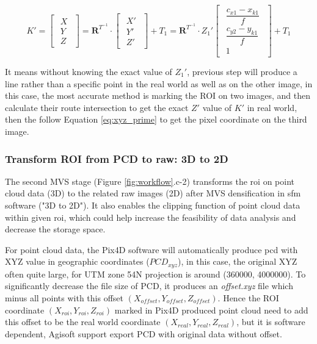 \documentclass{configs/bmcart}
\begin{document}
$$
  K' = 
  \begin{bmatrix}
    \begin{matrix}
      X \\ Y \\ Z
    \end{matrix}
  \end{bmatrix} 
  = 
  \mathbf{R}^{T^{-1}} \cdot 
  \begin{bmatrix}
    \begin{matrix}
      X' \\ Y' \\ Z'
    \end{matrix}
  \end{bmatrix} + T_1
  =
  \mathbf{R}^{T^{-1}} \cdot Z_1'
  \begin{bmatrix}
    \begin{matrix}
      \dfrac{c_{x1}- x_{k1}}{f} \\ \dfrac{c_{y2} - y_{k1}}{f} \\ 1
    \end{matrix}
  \end{bmatrix} + T_1
$$

It means without knowing the exact value of $Z_1'$, previous step will produce a line rather than a specific point in the real world as well as on the other image, in this case, the most accurate method is marking the ROI on two images, and then calculate their route intersection to get the exact $Z'$ value of $K'$ in real world, then the follow Equation \ref{eq:xyz_prime} to get the pixel coordinate on the third image. 

\subsubsection*{Transform ROI from PCD to raw: 3D to 2D}
The second MVS stage (Figure \ref{fig:workflow}.c-2) transforms the \acrfull*{roi} on point cloud data (3D) to the related raw images (2D) after MVS densification in \acrlong*{sfm} software ("3D to 2D"). It also enables the clipping function of point cloud data within given \acrshort*{roi}, which could help increase the feasibility of data analysis and decrease the storage space.

For point cloud data, the Pix4D software will automatically produce \acrfull*{pcd} with XYZ value in geographic coordinates ($PCD_{xyz}$), in this case, the original XYZ often quite large, for UTM zone 54N projection is around (360000, 4000000). To significantly decrease the file size of PCD, it produces an \textit{offset.xyz} file which minus all points with this offset $(X_{offset}, Y_{offset}, Z_{offset})$. Hence the ROI coordinate $(X_{roi}, Y_{roi}, Z_{roi})$ marked in Pix4D produced point cloud need to add this offset to be the real world coordinate $(X_{real}, Y_{real}, Z_{real})$, but it is software dependent, Agisoft support export PCD with original data without offset.
\end{document}
